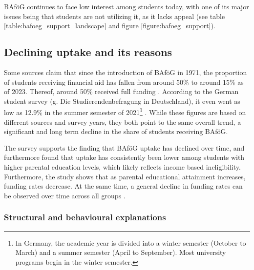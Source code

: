 BAföG continues to face low interest among students today, with one of its major issues being that students are not utilizing it, as it lacks appeal (see table \ref{table:bafoeg_support_landscape} and figure \ref{figure:bafoeg_support}). 

\subsection{Declining uptake and its reasons}
\label{subsection:declining-uptake}

Some sources claim that since the introduction of BAföG in 1971, the proportion of students receiving financial aid has fallen from around 50\% to around 15\% as of 2023. Thereof, around 50\% received full funding \citep{meier_bafog_2024}. According to the German student survey (g. Die Studierendenbefragung in Deutschland), it even went as low as 12.9\% in the summer semester of 2021\footnote{
In Germany, the academic year is divided into a winter semester (October to March) and a summer semester (April to September). Most university programs begin in the winter semester.
} \citep{kroher_studierendenbefragung_2023}. While these figures are based on different sources and survey years, they both point to the same overall trend, a significant and long term decline in the share of students receiving BAföG.

The survey supports the finding that BAföG uptake has declined over time, and furthermore found that uptake has consistently been lower among students with higher parental education levels, which likely reflects income based ineligibility. Furthermore, the study shows that as parental educational attainment increases, funding rates decrease. At the same time, a general decline in funding rates can be observed over time across all groups \citep{kroher_studierendenbefragung_2023}.

\subsubsection*{Structural and behavioural explanations}
\label{subsection:structural-and-behavioural-explanations}

